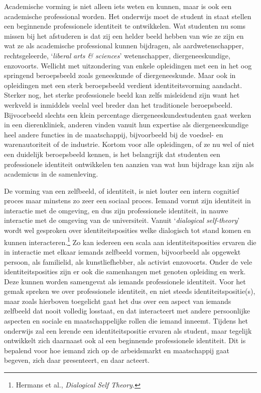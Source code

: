 \documentclass[smallauthor, chapterhaspagenum, nochapterinheader, pagenuminheader,  bigchapnum,medium2, tocpages, garamond, titleinheader]{jote-book}
\begin{document}
	Academische vorming is niet alleen iets weten en kunnen, maar is ook een academische professional worden. Het onderwijs moet de student in staat stellen een beginnende professionele identiteit te ontwikkelen. Wat studenten nu soms missen bij het afstuderen is dat zij een helder beeld hebben van wie ze zijn en wat ze als academische professional kunnen bijdragen, als aardwetenschapper, rechtsgeleerde, ‘\emph{liberal}\emph{ arts \& }\emph{science}\emph{s}' wetenschapper, diergeneeskundige, enzovoorts. Wellicht met uitzondering van enkele opleidingen met een in het oog springend beroepsbeeld zoals geneeskunde of diergeneeskunde. Maar ook in opleidingen met een sterk beroepsbeeld verdient identiteitsvorming aandacht. Sterker nog, het sterke professionele beeld kan zelfs misleidend zijn want het werkveld is inmiddels veelal veel breder dan het traditionele beroepsbeeld. Bijvoorbeeld slechts een klein percentage diergeneeskundestudenten gaat werken in een dierenkliniek, anderen vinden vanuit hun expertise als diergeneeskundige heel andere functies in de maatschappij, bijvoorbeeld bij de voedsel- en warenautoriteit of de industrie. Kortom voor alle opleidingen, of ze nu wel of niet een duidelijk beroepsbeeld kennen, is het belangrijk dat studenten een professionele identiteit ontwikkelen ten aanzien van wat hun bijdrage kan zijn als academicus in de samenleving.



	De vorming van een zelfbeeld, of identiteit, is niet louter een intern cognitief proces maar minstens zo zeer een sociaal proces. Iemand vormt zijn identiteit in interactie met de omgeving, en dus zijn professionele identiteit, in nauwe interactie met de omgeving van de universiteit. Vanuit ‘\emph{d}\emph{ialogical}\emph{ }\emph{self-theory}' wordt wel gesproken over identiteitsposities welke dialogisch tot stand komen en kunnen interacteren.\footnote{Hermans et al., \emph{Dialogical}\emph{ }\emph{Self}\emph{ }\emph{Theory}\emph{.}} Zo kan iedereen een scala aan identiteitsposities ervaren die in interactie met elkaar iemands zelfbeeld vormen, bijvoorbeeld als opgewekt persoon, als familielid, als kunstliefhebber, als activist enzovoorts. Onder de vele identiteitsposities zijn er ook die samenhangen met genoten opleiding en werk. Deze kunnen worden samengevat als iemands professionele identiteit. Voor het gemak spreken we over professionele identiteit, en niet steeds identiteitspositie(s), maar zoals hierboven toegelicht gaat het dus over een aspect van iemands zelfbeeld dat nooit volledig losstaat, en dat interacteert met andere persoonlijke aspecten en sociale en maatschappelijke rollen die iemand inneemt. Tijdens het onderwijs zal een lerende een identiteitspositie ervaren als student, maar tegelijk ontwikkelt zich daarnaast ook al een beginnende professionele identiteit. Dit is bepalend voor hoe iemand zich op de arbeidsmarkt en maatschappij gaat begeven, zich daar presenteert, en daar acteert.
\end{document}
